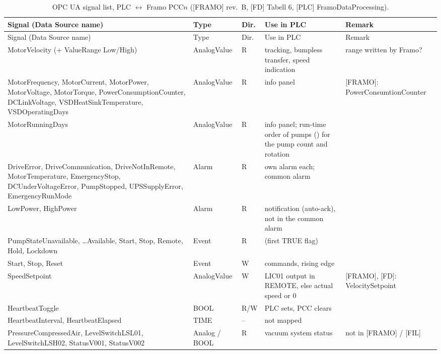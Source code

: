 \documentclass[11pt,a4paper]{article}
\begin{document}
\begin{small}
\begin{longtable}{@{}P{52mm}P{20mm}P{7mm}P{36mm}P{32mm}@{}}
\caption{OPC UA signal list, PLC $\leftrightarrow$ Framo PCC$n$ ([FRAMO] rev.~B, [FD] Tabell 6, [PLC]
FramoDataProcessing).}\label{tab:opcua}\\
\toprule
Signal (Data Source name) & Type & Dir. & Use in PLC & Remark \\
\midrule
\endfirsthead
\toprule
Signal (Data Source name) & Type & Dir. & Use in PLC & Remark \\
\midrule
\endhead
\bottomrule
\endfoot
MotorVelocity (+ ValueRange Low/High) & AnalogValue & R & tracking, bumpless transfer, speed indication & range written by Framo? \\
MotorFrequency, MotorCurrent, MotorPower, MotorVoltage, MotorTorque, PowerConsumptionCounter, DCLinkVoltage, VSDHeatSinkTemperature, VSDOperatingDays & AnalogValue & R & info panel & [FRAMO]: PowerConsumtionCounter \\
MotorRunningDays & AnalogValue & R & info panel; run-time order of pumps () for the pump count and rotation & \\
DriveError, DriveCommunication, DriveNotInRemote, MotorTemperature, EmergencyStop, DCUnderVoltageError, PumpStopped, UPSSupplyError, EmergencyRunMode & Alarm & R & own alarm each; common alarm & \\
LowPower, HighPower & Alarm & R & notification (auto-ack), not in the common alarm & \\
PumpStateUnavailable, \ldots Available, Start, Stop, Remote, Hold, Lockdown & Event & R &  (first TRUE flag) & \\
Start, Stop, Reset & Event & W & commands, rising edge &  \\
SpeedSetpoint & AnalogValue & W & LIC01 output in REMOTE, else actual speed or 0 & [FRAMO], [FD]: Velocity\-Setpoint \\
HeartbeatToggle & BOOL & R/W & PLC sets, PCC clears &  \\
HeartbeatInterval, HeartbeatElapsed & TIME & -- & not mapped &  \\
PressureCompressedAir, LevelSwitchLSL01, LevelSwitchLSH02, StatusV001, StatusV002 & Analog / BOOL & R & vacuum system status & not in [FRAMO] / [FIL] \\
\end{longtable}
\end{small}
\end{document}
